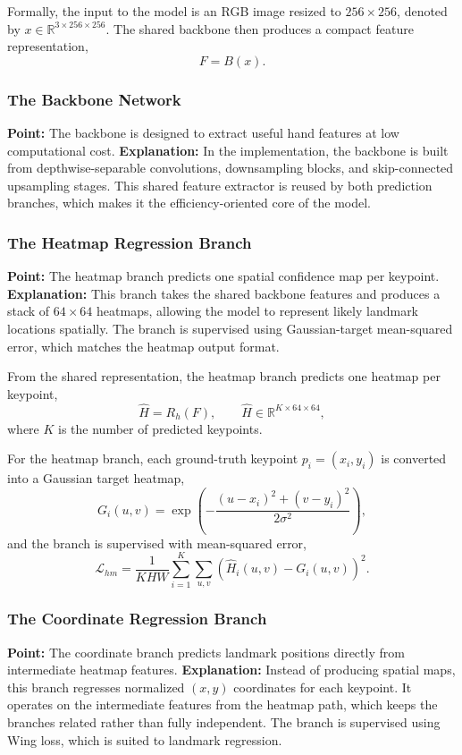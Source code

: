 \documentclass[10pt,letterpaper]{article}
\begin{document}
Formally, the input to the model is an RGB image resized to $256 \times 256$, denoted by $x \in \mathbb{R}^{3 \times 256 \times 256}$. The shared backbone then produces a compact feature representation,
\[
F = B(x).
\]

\subsubsection{The Backbone Network}

\noindent\textbf{Point:} The backbone is designed to extract useful hand features at low computational cost.  
\textbf{Explanation:} In the implementation, the backbone is built from depthwise-separable convolutions, downsampling blocks, and skip-connected upsampling stages. This shared feature extractor is reused by both prediction branches, which makes it the efficiency-oriented core of the model.

\subsubsection{The Heatmap Regression Branch}

\noindent\textbf{Point:} The heatmap branch predicts one spatial confidence map per keypoint.  
\textbf{Explanation:} This branch takes the shared backbone features and produces a stack of $64 \times 64$ heatmaps, allowing the model to represent likely landmark locations spatially. The branch is supervised using Gaussian-target mean-squared error, which matches the heatmap output format.

From the shared representation, the heatmap branch predicts one heatmap per keypoint,
\[
\hat{H} = R_h(F), \qquad \hat{H} \in \mathbb{R}^{K \times 64 \times 64},
\]
where $K$ is the number of predicted keypoints.

For the heatmap branch, each ground-truth keypoint $p_i = (x_i, y_i)$ is converted into a Gaussian target heatmap,
\[
G_i(u,v) = \exp\left(
-\frac{(u-x_i)^2 + (v-y_i)^2}{2\sigma^2}
\right),
\]
and the branch is supervised with mean-squared error,
\[
\mathcal{L}_{hm}
=
\frac{1}{KHW}
\sum_{i=1}^{K}
\sum_{u,v}
\left(\hat{H}_i(u,v) - G_i(u,v)\right)^2.
\]

\subsubsection{The Coordinate Regression Branch}

\noindent\textbf{Point:} The coordinate branch predicts landmark positions directly from intermediate heatmap features.  
\textbf{Explanation:} Instead of producing spatial maps, this branch regresses normalized $(x,y)$ coordinates for each keypoint. It operates on the intermediate features from the heatmap path, which keeps the branches related rather than fully independent. The branch is supervised using Wing loss, which is suited to landmark regression.
\end{document}
